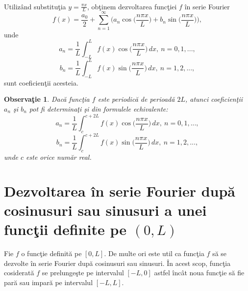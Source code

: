\documentclass[a4paper,openany,12pt]{report}
\newtheorem{notice}{Observa\c tie}[section]
\begin{document}
\paragraph*{} Utiliz\^ and substitu\c tia $y=\frac{\pi x}{L}$, ob\c tinem dezvoltarea func\c tiei $f$ \^ in serie Fourier
\begin{equation*}
f(x)=\frac{a_0}{2} + \sum_{n=1}^\infty\bigg(a_n\cos\Big(\frac{n\pi x}{L}\Big)+b_n\sin\Big(\frac{n\pi x}{L}\Big)\bigg),
\end{equation*}
unde
\begin{equation*}
a_n=\frac{1}{L}\int_{-L}^{L} f(x) \cos\Big(\frac{n\pi x}{L}\Big)\, dx,\: n =0, 1, ...,
\end{equation*}
\begin{equation*}
b_n=\frac{1}{L}\int_{-L}^{L} f(x) \sin\Big(\frac{n\pi x}{L}\Big)\, dx, \: n=1, 2, ...,
\end{equation*}
sunt coeficien\c tii acesteia.
\begin{notice}Dac\u a func\c tia $f$ este periodic\u a de perioad\u a $2L$, atunci coeficien\c tii $a_n$ \c si $b_n$ pot fi determina\c ti \c si din formulele echivalente:
\begin{equation*}
a_n=\frac{1}{L}\int_{c}^{c+2L} f(x) \cos\Big(\frac{n\pi x}{L}\Big)\, dx,\: n =0, 1, ...,
\end{equation*}
\begin{equation*}
b_n=\frac{1}{L}\int_{c}^{c+2L} f(x) \sin\Big(\frac{n\pi x}{L}\Big)\, dx, \: n=1, 2, ...,
\end{equation*}
unde $c$ este orice num\u ar real.
\end{notice}






\section{Dezvoltarea \^ in serie Fourier dup\u a cosinusuri sau sinusuri a unei func\c tii definite pe $(0,L)$}
\paragraph*{} Fie $f$ o func\c tie definit\u a pe $[0, L]$. De multe ori este util ca func\c tia $f$ s\u a se dezvolte \^ in serie Fourier dup\u a cosinusuri sau sinusuri. \^ In acest scop, func\c tia cosiderat\u a $f$ se prelunge\c ste pe intervalul $[-L, 0]$ astfel \^ inc\^ at noua func\c tie s\u a fie par\u a sau impar\u a pe intervalul $[-L, L]$.
\end{document}
